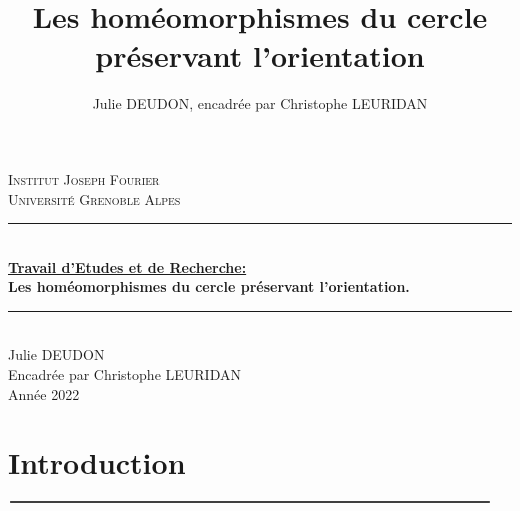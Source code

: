 \documentclass[11pt,a4 paper]{article}
\title{Les homéomorphismes du cercle préservant l'orientation}
\author{Julie DEUDON, encadrée par Christophe LEURIDAN}
\begin{document}
	\begin{titlepage}
		\newcommand{\HRule}{\rule{\linewidth}{0.5mm}}
		\begin{center}
			\textsc{\LARGE
				Institut Joseph Fourier
				\\Université Grenoble Alpes
			} \\[3cm]
	
			\HRule \\[0.4cm]
			{ \Huge \bfseries \underline{Travail d'Etudes et de Recherche:}\\[0,15cm]\huge Les homéomorphismes du cercle préservant l'orientation. \\[0.15cm] }
			\HRule \\[1.5cm]
			\huge Julie DEUDON
			\\Encadrée par Christophe LEURIDAN\\
			\vspace{11cm}
			\Large Année 2022
			\\[1cm]
		\end{center}
	\end{titlepage}

	\newpage
	\tableofcontents
	
	
\newpage
\section*{\huge Introduction}
\begin{center}
	$\rule{\linewidth}{0.4mm}$
\end{center}
\vspace{1cm}
\end{document}

